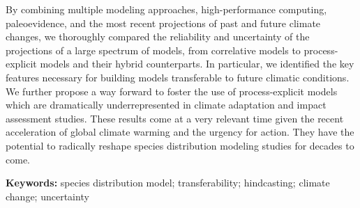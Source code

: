 {By combining multiple modeling approaches, high-performance computing, paleoevidence, and the most recent projections of past and future climate changes, we thoroughly compared the reliability and uncertainty of the projections of a large spectrum of models, from correlative models to process-explicit models and their hybrid counterparts. In particular, we identified the key features necessary for building models transferable to future climatic conditions. We further propose a way forward to foster the use of process-explicit models which are dramatically underrepresented in climate adaptation and impact assessment studies. These results come at a very relevant time given the recent acceleration of global climate warming and the urgency for action. They have the potential to radically reshape species distribution modeling studies for decades to come.

\textbf{Keywords:}
species distribution model; transferability; hindcasting; climate change; uncertainty

}
\vfill\null



\newpage